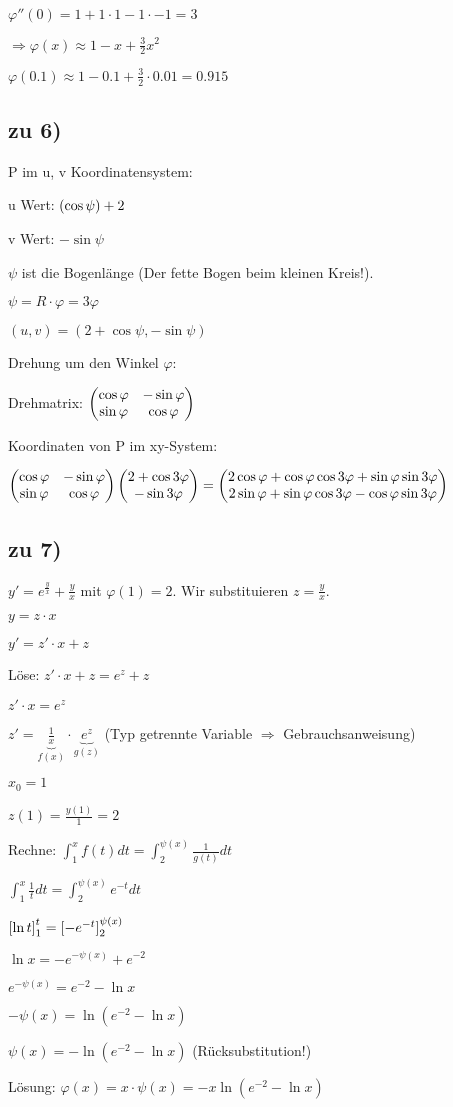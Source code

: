 $ \varphi''(0) = 1 + 1 \cdot 1 - 1 \cdot - 1 = 3$

$\Rightarrow \varphi(x) \approx 1 - x + \frac{3}{2} x^2 $

$ \varphi(0.1) \approx 1 - 0.1 + \frac{3}{2} \cdot 0.01 = 0.915 $

\subsection{zu 6)}
P im u, v Koordinatensystem: 

u Wert: $ \left( \cos \psi \right)  + 2$ 

v Wert: $ - \sin \psi$

$\psi$ ist die Bogenlänge (Der fette Bogen beim kleinen Kreis!).

$\psi = R \cdot \varphi = 3 \varphi$

$(u,v) = (2 + \cos \psi, -\sin \psi)$

Drehung um den Winkel $\varphi$: 

Drehmatrix: $ \begin{pmatrix} \cos \varphi & -\sin \varphi\\\sin \varphi & \cos \varphi \end{pmatrix} $

Koordinaten von P im xy-System:
 
$  \begin{pmatrix} \cos \varphi & -\sin \varphi\\\sin \varphi & \cos \varphi \end{pmatrix}   \begin{pmatrix} 2 + \cos 3 \varphi\\-\sin 3\varphi \end{pmatrix} 
=  \begin{pmatrix} 2\cos \varphi + \cos \varphi \cos 3 \varphi + \sin \varphi \sin 3 \varphi\\2\sin \varphi + \sin \varphi \cos 3 \varphi - \cos \varphi \sin 3 \varphi \end{pmatrix} 
$

\subsection{zu 7)}
$y' = e^{\frac{y}{x}} + \frac{y}{x}$ mit $\varphi(1) = 2$. Wir substituieren $z = \frac{y}{x}$. 

$y = z \cdot x$

$y' = z' \cdot x + z $

Löse: $z' \cdot x + z = e^z + z$

$z'\cdot x = e^z$

$z' = \underbrace{\frac{1}{x}}_{f(x)} \cdot \underbrace{e^z}_{g(z)}$ (Typ getrennte Variable $\Rightarrow$ Gebrauchsanweisung)

$x_0 = 1$

$z(1)= \frac{y(1)}{1} = 2$

Rechne: 
$ \int_{1}^{x} f(t) dt = \int_{2}^{\psi(x)} \frac{1}{g(t)} dt $

$ \int_{1}^{x} \frac{1}{t} dt = \int_{2}^{\psi(x)} e^{-t} dt$

$  \left[ \ln t \right] _1^t =  \left[ -e^{-t} \right] _2^{\psi(x)} $

$ \ln x = -e^{-\psi(x)} + e^{-2} $

$ e^{-\psi(x)} = e^{-2} - \ln x $

$ -\psi(x) = \ln(e^{-2} - \ln x) $

$ \psi(x) = -\ln(e^{-2} - \ln x) $ (Rücksubstitution!)

Lösung:
$ \varphi(x) = x \cdot \psi(x) = - x \ln(e^{-2} - \ln x)$
